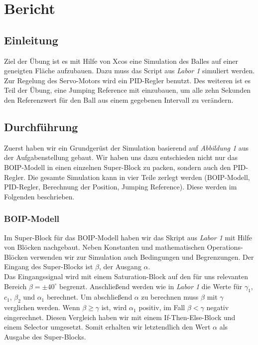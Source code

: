 \section{Bericht}

\subsection{Einleitung}
Ziel der Übung ist es mit Hilfe von Xcos eine Simulation des Balles auf einer geneigten Fläche aufzubauen. Dazu muss das Script aus \textit{Labor 1} simuliert werden. Zur Regelung des Servo-Motors wird ein PID-Regler benutzt. Des weiteren ist es Teil der Übung, eine Jumping Reference mit einzubauen, um alle zehn Sekunden den Referenzwert für den Ball aus einem gegebenen Intervall zu verändern.

\subsection{Durchführung}
Zuerst haben wir ein Grundgerüst der Simulation basierend auf \textit{Abbildung 1} aus der Aufgabenstellung gebaut. Wir haben uns dazu entschieden nicht nur das BOIP-Modell in einen einzelnen Super-Block zu packen, sondern auch den PID-Regler. Die gesamte Simulation kann in vier Teile zerlegt werden (BOIP-Modell, PID-Regler, Berechnung der Position, Jumping Reference). Diese werden im Folgenden beschrieben.

\subsubsection{BOIP-Modell}
Im Super-Block für das BOIP-Modell haben wir das Skript aus \textit{Labor 1} mit Hilfe von Blöcken nachgebaut. Neben Konstanten und mathematischen Operations-Blöcken verwenden wir zur Simulation auch Bedingungen und Begrenzungen. Der Eingang des Super-Blocks ist $\beta$, der Ausgang $\alpha$. \\
Das Eingangssignal wird mit einem Saturation-Block auf den für uns relevanten Bereich $\beta = \pm 40 ^\circ$ begrenzt. Anschließend werden wie in \textit{Labor 1} die Werte für $\gamma_1$, $c_1$, $\beta_2$ und $\alpha_1$ berechnet. Um abschließend $\alpha$ zu berechnen muss $\beta$ mit $\gamma$ verglichen werden. Wenn $\beta \geq \gamma$ ist, wird $\alpha_1$ positiv, im Fall $\beta < \gamma$ negativ eingerechnet. Diesen Vergleich haben wir mit einem If-Then-Else-Block und einem Selector umgesetzt. Somit erhalten wir letztendlich den Wert $\alpha$ als Ausgabe des Super-Blocks.

